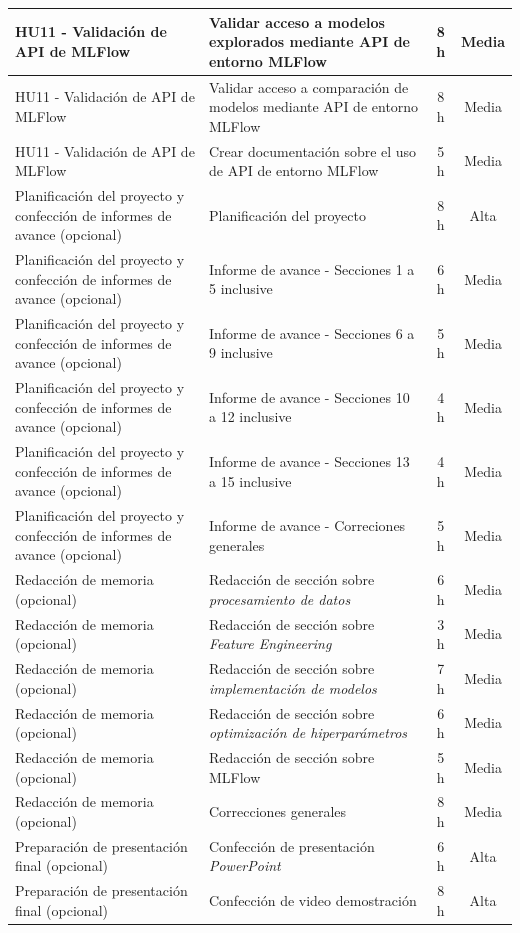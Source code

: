 \documentclass[
11pt, %
]{charter}
\begin{document}
\begin{xltabular}{\linewidth}{@{}|X|X|c|c|@{}}
HU11 - Validación de API de MLFlow & Validar acceso a modelos explorados mediante API de entorno MLFlow & 8 h & Media \\ \hline
HU11 - Validación de API de MLFlow & Validar acceso a comparación de modelos mediante API de entorno MLFlow & 8 h & Media \\ \hline
HU11 - Validación de API de MLFlow & Crear documentación sobre el uso de API de entorno MLFlow & 5 h & Media \\ \hline
Planificación del proyecto y confección de informes de avance (opcional) & Planificación del proyecto & 8 h & Alta \\ \hline
Planificación del proyecto y confección de informes de avance (opcional) & Informe de avance - Secciones 1 a 5 inclusive & 6 h & Media \\ \hline
Planificación del proyecto y confección de informes de avance (opcional) & Informe de avance - Secciones 6 a 9 inclusive & 5 h & Media \\ \hline
Planificación del proyecto y confección de informes de avance (opcional) & Informe de avance - Secciones 10 a 12 inclusive & 4 h & Media \\ \hline
Planificación del proyecto y confección de informes de avance (opcional) & Informe de avance - Secciones 13 a 15 inclusive & 4 h & Media \\ \hline
Planificación del proyecto y confección de informes de avance (opcional) & Informe de avance - Correciones generales & 5 h & Media \\ \hline
Redacción de memoria (opcional) & Redacción de sección sobre \textit{procesamiento de datos} & 6 h & Media \\ \hline
Redacción de memoria (opcional) & Redacción de sección sobre \textit{Feature Engineering} & 3 h & Media \\ \hline
Redacción de memoria (opcional) & Redacción de sección sobre \textit{implementación de modelos} & 7 h & Media \\ \hline
Redacción de memoria (opcional) & Redacción de sección sobre \textit{optimización de hiperparámetros} & 6 h & Media \\ \hline
Redacción de memoria (opcional) & Redacción de sección sobre MLFlow & 5 h & Media \\ \hline
Redacción de memoria (opcional) & Correcciones generales & 8 h & Media \\ \hline
Preparación de presentación final (opcional) & Confección de presentación \textit{PowerPoint} & 6 h & Alta \\ \hline
Preparación de presentación final (opcional) & Confección de video demostración & 8 h & Alta \\ \hline
\end{xltabular}
\end{document}
